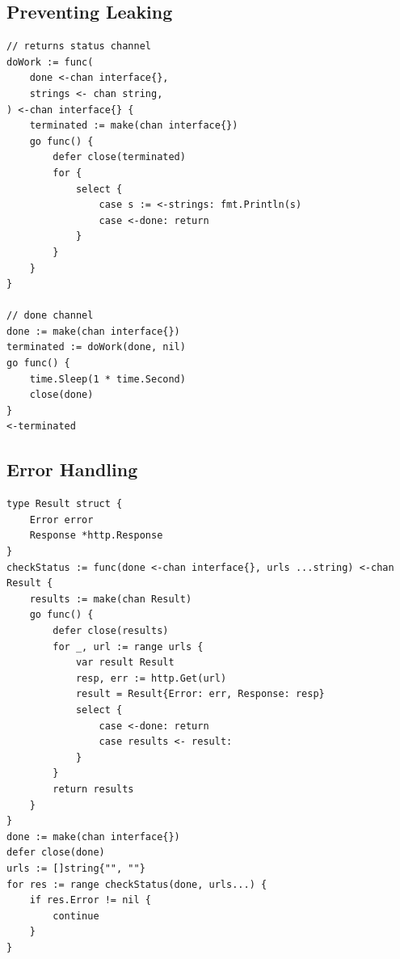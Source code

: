 \documentclass{article}
\begin{document}
\subsection{Preventing Leaking}
\begin{lstlisting}[language=Golang]
// returns status channel
doWork := func(
    done <-chan interface{},
    strings <- chan string,
) <-chan interface{} {
    terminated := make(chan interface{})
    go func() {
        defer close(terminated)
        for {
            select {
                case s := <-strings: fmt.Println(s)
                case <-done: return
            }
        }
    }
}

// done channel
done := make(chan interface{})
terminated := doWork(done, nil)
go func() {
    time.Sleep(1 * time.Second)
    close(done)
}
<-terminated
\end{lstlisting}

\subsection{Error Handling}
\begin{lstlisting}[language=Golang]
type Result struct {
    Error error
    Response *http.Response
}
checkStatus := func(done <-chan interface{}, urls ...string) <-chan Result {
    results := make(chan Result)
    go func() {
        defer close(results)
        for _, url := range urls {
            var result Result
            resp, err := http.Get(url)
            result = Result{Error: err, Response: resp}
            select {
                case <-done: return
                case results <- result:
            }
        }
        return results
    }
}
done := make(chan interface{})
defer close(done)
urls := []string{"", ""}
for res := range checkStatus(done, urls...) {
    if res.Error != nil {
        continue
    }
}
\end{lstlisting}
\end{document}

